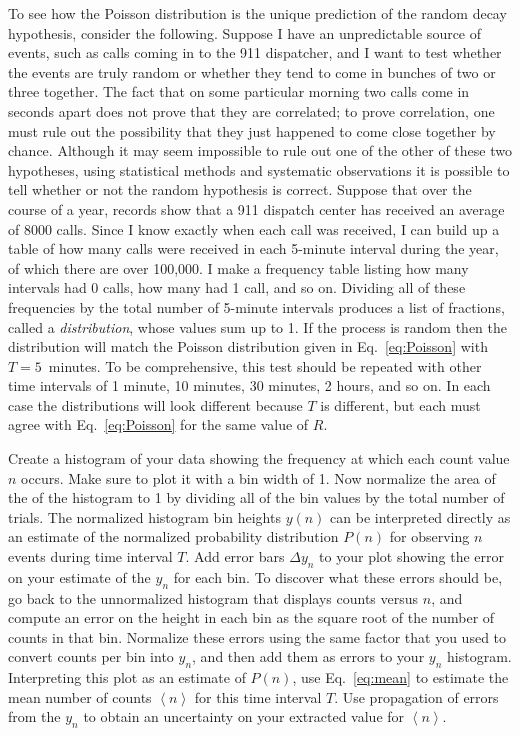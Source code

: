 \documentclass{revtex4}
\begin{document}
To see how
the Poisson distribution is the unique prediction of the random decay
hypothesis, consider the following.  Suppose I have an unpredictable source
of events, such as calls coming in to the 911 dispatcher, and I want to
test whether the events are truly random or whether they tend to come in
bunches of two or three together.  The fact that on some particular morning
two calls come in seconds apart does not prove that they are correlated;
to prove correlation, one must rule out the possibility that they just
happened to come close together by chance.  Although it may seem impossible
to rule out one of the other of these two hypotheses, using statistical
methods and systematic observations it is possible to tell whether or not
the random hypothesis is correct.  Suppose that over the course of a year,
records show that a 911 dispatch center has received an average of 8000 calls.
Since I know exactly when each call was received, I can build up a table
of how many calls were received in each 5-minute interval during the year,
of which there are over 100,000.  I make a frequency table listing how many
intervals had 0 calls, how many had 1 call, and so on.  Dividing all of
these frequencies by the total number of 5-minute intervals produces a list of
fractions, called a {\em distribution}, whose values sum up to 1.  If the
process is random then the distribution will match the Poisson distribution
given in Eq.~\ref{eq:Poisson} with $T=5$~minutes.  To be comprehensive, this
test should be repeated with other time intervals of 1 minute, 10 minutes,
30 minutes, 2 hours, and so on.  In each case the distributions will look
different because $T$ is different, but each must agree with
Eq.~\ref{eq:Poisson} for {the same value of $R$}.

Create a histogram of your data showing the frequency at which each count value
$n$ occurs.  Make sure to plot it with a bin width of 1.  Now normalize the area
of the of the histogram to 1 by dividing all of the bin values by the total
number of trials.  The normalized histogram bin heights $y(n)$ can be
interpreted directly as an estimate of the normalized probability distribution
$P(n)$ for observing $n$ events during time interval $T$.  Add error bars
$\Delta y_n$ to your plot showing the error on your estimate of the $y_n$
for each bin.  To discover what these errors should be, go back to the
unnormalized histogram that displays counts versus $n$, and compute an
error on the height in each bin as the square root of the number of counts
in that bin.  Normalize these errors using the same factor that you used
to convert counts per bin into $y_n$, and then add them as errors to your
$y_n$ histogram.  Interpreting this plot as an estimate of $P(n)$, use
Eq.~\ref{eq:mean} to estimate the mean number of counts $\left<n\right>$
for this time interval $T$.  Use propagation of errors from the $y_n$ to
obtain an uncertainty on your extracted value for $\left<n\right>$.
\end{document}
